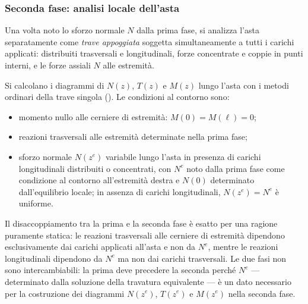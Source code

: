 



\subsubsection{Seconda fase: analisi locale dell'asta}
\label{subsec:fase2_locale}

Una volta noto lo sforzo normale $N$ dalla prima
fase, si analizza l'asta separatamente come
\emph{trave appoggiata} soggetta simultaneamente
a tutti i carichi applicati: distribuiti trasversali
e longitudinali, forze concentrate e coppie in
punti interni, e le forze assiali $N$ alle estremità.

Si calcolano i diagrammi di $N(z)$, $T(z)$ e $M(z)$
lungo l'asta con i metodi ordinari della trave
singola (). Le condizioni
al contorno sono:
\begin{itemize}[noitemsep]
	\item momento nullo alle cerniere di estremità:
	$M(0) = M(\ell) = 0$;
	\item reazioni trasversali alle estremità
	determinate nella prima fase;
	\item sforzo normale $N(z^e)$ variabile lungo l'asta
	in presenza di carichi longitudinali distribuiti
	o concentrati, con $N^e$ noto dalla prima fase
	come condizione al contorno all'estremità destra
	e $N(0)$ determinato dall'equilibrio locale;
	in assenza di carichi longitudinali, $N(z^e) = N^e$
	è uniforme.
\end{itemize}


\begin{oss}
	Il disaccoppiamento tra la prima e la seconda
	fase è esatto per una ragione puramente statica:
	le reazioni trasversali alle cerniere di estremità
	dipendono esclusivamente dai carichi applicati
	all'asta e non da $N^e$, mentre le reazioni
	longitudinali dipendono da $N^e$ ma non dai
	carichi trasversali. Le due fasi non sono
	intercambiabili: la prima deve precedere la
	seconda perché $N^e$ --- determinato dalla
	soluzione della travatura equivalente --- è
	un dato necessario per la costruzione dei
	diagrammi $N(z^e)$, $T(z^e)$ e $M(z^e)$
	nella seconda fase.
\end{oss}

